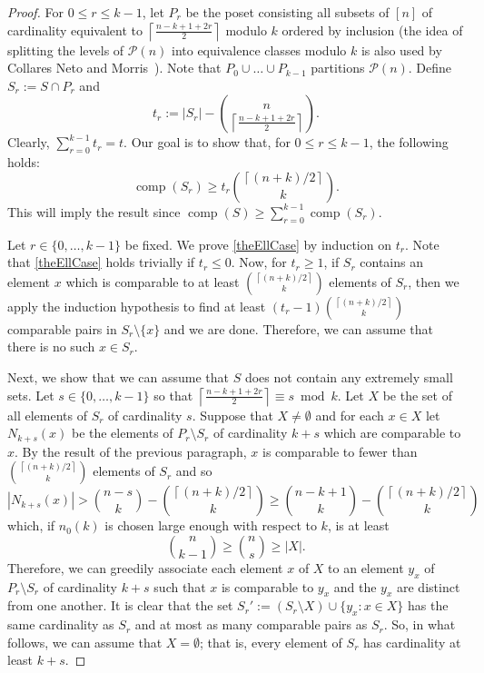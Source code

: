 \documentclass[11 pt]{article}
\theoremstyle{definition}
\theoremstyle{case}
\numberwithin{equation}{section}
\DeclareMathOperator{\comp}{comp}
\begin{document}
\begin{proof}
For $0\leq r\leq k-1$, let $P_r$ be the poset consisting all subsets of $[n]$ of cardinality equivalent to $\left\lceil \frac{n-k+1+2r}{2}\right\rceil$ modulo $k$ ordered by inclusion (the idea of splitting the levels of $\mathcal{P}(n)$ into equivalence classes modulo $k$ is also used by Collares Neto and Morris~\cite{RandomErdos}). Note that $P_0\cup \dots \cup P_{k-1}$ partitions $\mathcal{P}(n)$. Define $S_r:=S\cap P_{r}$ and
\[t_r:=|S_r| - \binom{n}{\left\lceil \frac{n-k+1+2r}{2}\right\rceil}.\] 
Clearly, $\sum_{r=0}^{k-1}t_r = t$. Our goal is to show that, for $0\leq r\leq k-1$, the following holds:
\begin{equation}\label{theEllCase}\comp(S_r)\geq t_r\binom{\left\lceil (n+k)/2\right\rceil}{k}.\end{equation} 
This will imply the result since  $\comp(S)\geq \sum_{r=0}^{k-1}\comp(S_r)$.

Let $r\in \{0,\dots,k-1\}$ be fixed. We prove \eqref{theEllCase} by induction on $t_r$. Note that \eqref{theEllCase} holds trivially if $t_r\leq 0$. Now, for $t_r\geq1$, if $S_r$ contains an element $x$ which is comparable to at least $\binom{\left\lceil (n+k)/2\right\rceil}{k}$ elements of $S_r$, then we apply the induction hypothesis to find at least $(t_r-1)\binom{\left\lceil (n+k)/2\right\rceil}{k}$ comparable pairs in $S_r\setminus\{x\}$ and we are done.  Therefore, we can assume that there is no such $x\in S_r$.

Next, we show that we can assume that $S$ does not contain any extremely small sets. Let $s\in\{0,\dots,k-1\}$ so that $\left\lceil \frac{n-k+1+2r}{2}\right\rceil\equiv s\bmod k$. Let $X$ be the set of all elements of $S_r$ of cardinality $s$. Suppose that $X\neq\emptyset$ and for each $x\in X$ let $N_{k+s}(x)$ be the elements of $P_r\setminus S_r$ of cardinality $k+s$ which are comparable to $x$. By the result of the previous paragraph, $x$ is comparable to fewer than $\binom{\left\lceil (n+k)/2\right\rceil}{k}$ elements of $S_r$ and so 
\[|N_{k+s}(x)|> \binom{n-s}{k} - \binom{\left\lceil (n+k)/2\right\rceil}{k} \geq \binom{n-k+1}{k}-\binom{\left\lceil (n+k)/2\right\rceil}{k}\]
which, if $n_0(k)$ is chosen large enough with respect to $k$, is at least
\[\binom{n}{k-1} \geq \binom{n}{s} \geq |X|.\]
Therefore, we can greedily associate each element $x$ of $X$ to an element $y_x$ of $P_r\setminus S_r$ of cardinality $k+s$ such that $x$ is comparable to $y_x$ and the $y_x$ are distinct from one another. It is clear that the set  $S_r':=(S_r\setminus X)\cup \{y_x: x\in X\}$ has the same cardinality as $S_r$ and at most as many comparable pairs as $S_r$. So, in what follows, we can assume that $X=\emptyset$; that is, every element of $S_r$ has cardinality at least $k+s$.


\end{proof}
\end{document}

